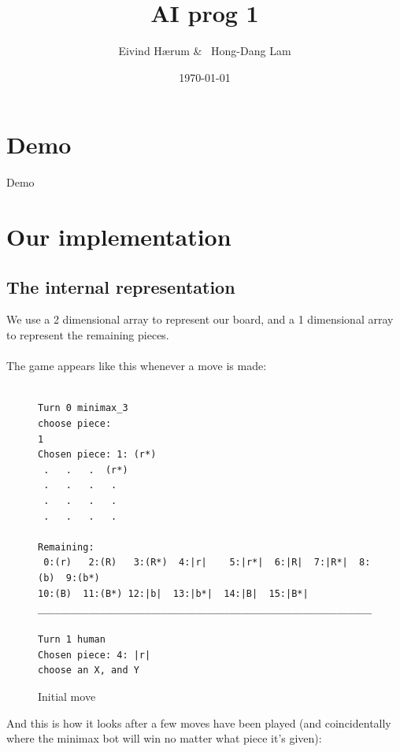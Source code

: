\documentclass[12pt, a4paper]{article}
\title{AI prog 1}
\author{Eivind Hærum \& \ Hong-Dang Lam}
\date{\today} %
\begin{document}
\maketitle
% 
% 
 
\newpage
\tableofcontents
\newpage
 
\section{Demo}
Demo

\section{Our implementation}

\subsection{The internal representation}
We use a 2 dimensional array to represent our board, and a 1 dimensional array to represent the remaining pieces.\\ \\
The game appears like this whenever a move is made:\\
\begin{figure}[H]
\begin{verbatim}

Turn 0 minimax_3
choose piece:
1
Chosen piece: 1: (r*)
 .   .   .  (r*)
 .   .   .   . 
 .   .   .   . 
 .   .   .   . 

Remaining:
 0:(r)   2:(R)   3:(R*)  4:|r|    5:|r*|  6:|R|  7:|R*|  8:(b)  9:(b*)  
10:(B)  11:(B*) 12:|b|  13:|b*|  14:|B|  15:|B*|  
____________________________________________________________

Turn 1 human
Chosen piece: 4: |r|
choose an X, and Y
\end{verbatim}
\caption{Initial move}
\label{figure1}
\end{figure}
\noindent
And this is how it looks after a few moves have been played (and coincidentally where the minimax bot will win no matter what piece it's given):\\
\end{document}
